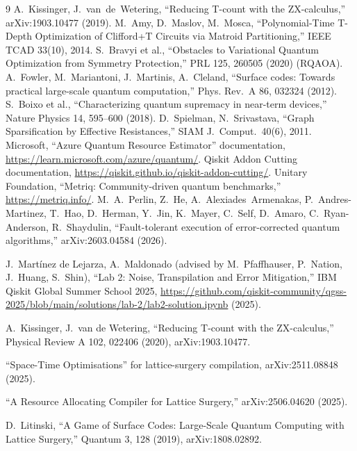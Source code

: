 \documentclass[9pt,twocolumn]{extarticle}
\begin{document}

\begin{thebibliography}{9}
\footnotesize
{} A.~Kissinger, J.~van~de~Wetering, ``Reducing T-count
with the ZX-calculus,'' arXiv:1903.10477 (2019).
 M.~Amy, D.~Maslov, M.~Mosca, ``Polynomial-Time T-Depth
Optimization of Clifford+T Circuits via Matroid Partitioning,'' IEEE TCAD
33(10), 2014.
 S.~Bravyi et al., ``Obstacles to Variational Quantum
Optimization from Symmetry Protection,'' PRL 125, 260505 (2020) (RQAOA).
 A.~Fowler, M.~Mariantoni, J.~Martinis, A.~Cleland,
``Surface codes: Towards practical large-scale quantum computation,'' Phys.
Rev.\ A 86, 032324 (2012).
 S.~Boixo et al., ``Characterizing quantum supremacy in
near-term devices,'' Nature Physics 14, 595--600 (2018).
 D.~Spielman, N.~Srivastava, ``Graph Sparsification by
Effective Resistances,'' SIAM J.\ Comput.\ 40(6), 2011.
 Microsoft, ``Azure Quantum Resource Estimator''
documentation, \url{https://learn.microsoft.com/azure/quantum/}.
 Qiskit Addon Cutting documentation,
\url{https://qiskit.github.io/qiskit-addon-cutting/}.
 Unitary Foundation, ``Metriq: Community-driven quantum
benchmarks,'' \url{https://metriq.info/}.
 M.~A.~Perlin, Z.~He, A.~Alexiades~Armenakas,
P.~Andres-Martinez, T.~Hao, D.~Herman, Y.~Jin, K.~Mayer, C.~Self,
D.~Amaro, C.~Ryan-Anderson, R.~Shaydulin, ``Fault-tolerant execution of
error-corrected quantum algorithms,'' arXiv:2603.04584 (2026).

 J.~Mart\'inez de Lejarza, A.~Maldonado (advised by
M.~Pfaffhauser, P.~Nation, J.~Huang, S.~Shin), ``Lab 2: Noise, Transpilation
and Error Mitigation,'' IBM Qiskit Global Summer School 2025,
\url{https://github.com/qiskit-community/qgss-2025/blob/main/solutions/lab-2/lab2-solution.ipynb}
(2025).

 A.~Kissinger, J.~van de Wetering,
``Reducing T-count with the ZX-calculus,'' Physical Review A 102, 022406
(2020), arXiv:1903.10477.

 ``Space-Time Optimisations'' for lattice-surgery
compilation, arXiv:2511.08848 (2025).

 ``A Resource Allocating Compiler for
Lattice Surgery,'' arXiv:2506.04620 (2025).

 D.~Litinski, ``A Game of Surface Codes:
Large-Scale Quantum Computing with Lattice Surgery,'' Quantum 3, 128
(2019), arXiv:1808.02892.


\end{thebibliography}
\end{document}
